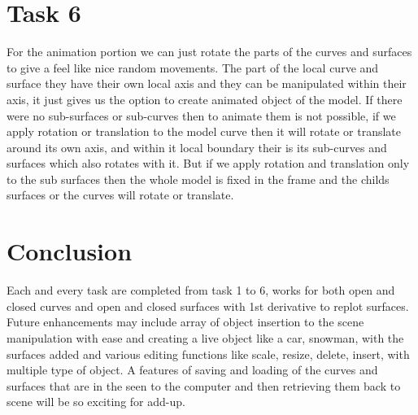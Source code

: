 \documentclass[a4,10pt]{article}
\begin{document}
\section{Task 6}
For the animation portion we can just rotate the parts of the curves and surfaces to give a feel like nice random movements. The part of the local curve and surface they have their own local axis and they can be manipulated within their axis, it just gives us the option
to create animated object of the model. If there were no sub-surfaces or sub-curves then to animate them is not possible, if we apply rotation or translation to the model curve then it will rotate or translate around its own axis, and within it local boundary their is its sub-curves and surfaces
which also rotates with it. But if we apply rotation and translation only to the sub surfaces then the whole model is fixed in the frame and the childs surfaces or the curves will rotate or translate.



\pagebreak




\section{Conclusion}
Each and every task are completed from task 1 to 6, works for both open and closed curves and open and closed surfaces with 1st derivative to replot surfaces.
  Future enhancements may include array of object insertion to the scene manipulation with ease and creating a live object like a car, snowman, with the surfaces added and various editing functions like scale, resize, delete, insert, with multiple type of object.
  A features of saving and loading of the curves and surfaces that are in the seen to the computer and then retrieving them back to scene will be so exciting for add-up.



\end{document}
